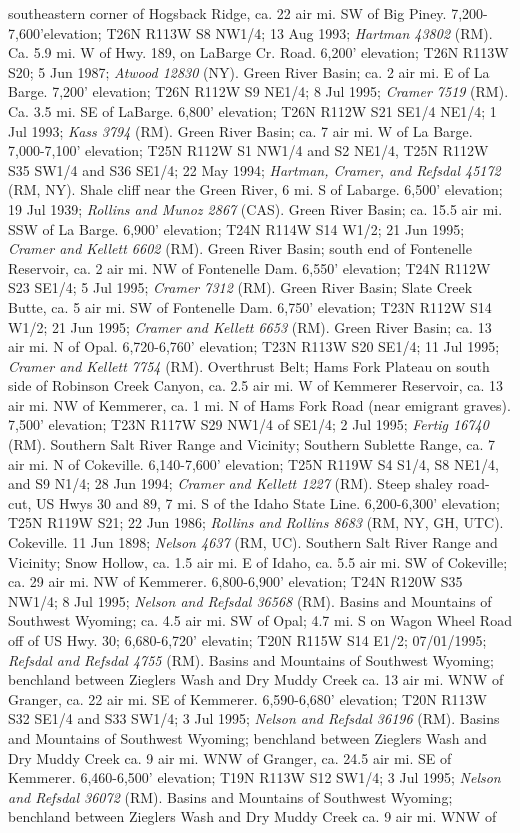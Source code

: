 southeastern corner of Hogsback Ridge, ca. 22 air mi. SW of Big Piney. 7,200-7,600'elevation; T26N R113W S8	NW1/4; 13 Aug 1993; \textit{Hartman 43802} (RM).  Ca. 5.9 mi. W of Hwy. 189, on LaBarge Cr. Road. 6,200' elevation; T26N R113W S20; 5 Jun 1987; \textit{Atwood 12830} (NY).  Green River Basin; ca. 2 air mi. E of La Barge. 7,200' elevation; T26N R112W S9 NE1/4; 8 Jul 1995; \textit{Cramer 7519} (RM).  Ca. 3.5 mi. SE of LaBarge. 6,800' elevation; T26N R112W S21 SE1/4 NE1/4; 1 Jul 1993; \textit{Kass 3794} (RM).  Green River Basin; ca. 7 air mi. W of La Barge. 7,000-7,100' elevation; T25N R112W S1 NW1/4 and S2 NE1/4, T25N R112W S35 SW1/4 and S36 SE1/4; 22 May 1994; \textit{Hartman, Cramer, and Refsdal 45172} (RM, NY).  Shale cliff near the Green River, 6 mi. S of Labarge. 6,500' elevation; 19 Jul 1939; \textit{Rollins and Munoz 2867} (CAS).  Green River Basin; ca. 15.5 air mi. SSW of La Barge. 6,900' elevation; T24N R114W S14 W1/2; 21 Jun 1995; \textit{Cramer and Kellett 6602} (RM).  Green River Basin; south end of Fontenelle Reservoir, ca. 2 air mi. NW of Fontenelle Dam. 6,550' elevation; T24N R112W S23 SE1/4; 5 Jul 1995; \textit{Cramer 7312} (RM).  Green River Basin; Slate Creek Butte, ca. 5 air mi. SW of Fontenelle Dam. 6,750' elevation; T23N R112W S14 W1/2; 21 Jun 1995; \textit{Cramer and Kellett 6653} (RM).  Green River Basin; ca. 13 air mi. N of Opal. 6,720-6,760' elevation; T23N R113W S20 SE1/4; 11 Jul 1995; \textit{Cramer and Kellett 7754} (RM).  Overthrust Belt; Hams Fork Plateau on south side of Robinson Creek Canyon, ca. 2.5 air mi. W of Kemmerer Reservoir, ca. 13 air mi. NW of Kemmerer, ca. 1 mi. N of Hams Fork Road (near emigrant graves). 7,500' elevation; T23N R117W S29 NW1/4 of SE1/4; 2 Jul 1995; \textit{Fertig 16740} (RM).  Southern Salt River Range and Vicinity; Southern Sublette Range, ca. 7 air mi. N of Cokeville. 6,140-7,600' elevation; T25N R119W S4 S1/4, S8 NE1/4, and S9 N1/4; 28 Jun 1994; \textit{Cramer and Kellett 1227} (RM).  Steep shaley road-cut, US Hwys 30 and 89, 7 mi. S of the Idaho State Line. 6,200-6,300' elevation; T25N R119W S21; 22 Jun 1986; \textit{Rollins and Rollins 8683} (RM, NY, GH, UTC).  Cokeville. 11 Jun 1898; \textit{Nelson 4637} (RM, UC).  Southern Salt River Range and Vicinity; Snow Hollow, ca. 1.5 air mi. E of Idaho, ca. 5.5 air mi. SW of Cokeville; ca. 29 air mi. NW of Kemmerer.  6,800-6,900' elevation; T24N R120W S35 NW1/4; 8 Jul 1995; \textit{Nelson and Refsdal 36568} (RM).  Basins and Mountains of Southwest Wyoming; ca. 4.5 air mi. SW of Opal; 4.7 mi. S on Wagon Wheel Road off of US Hwy. 30; 6,680-6,720' elevatin; T20N R115W S14 E1/2; 07/01/1995; \textit{Refsdal and Refsdal 4755} (RM).  Basins and Mountains of Southwest Wyoming; benchland between Zieglers Wash and Dry Muddy Creek ca. 13 air mi. WNW of Granger, ca. 22 air mi. SE of Kemmerer. 6,590-6,680' elevation; T20N R113W S32 SE1/4 and S33 SW1/4; 3 Jul 1995; \textit{Nelson and Refsdal 36196} (RM).  Basins and Mountains of Southwest Wyoming; benchland between Zieglers Wash and Dry Muddy Creek ca. 9 air mi. WNW of Granger, ca. 24.5 air mi. SE of Kemmerer. 6,460-6,500' elevation; T19N R113W S12 SW1/4; 3 Jul 1995; \textit{Nelson and Refsdal 36072} (RM).  Basins and Mountains of Southwest Wyoming; benchland between Zieglers Wash and Dry Muddy Creek ca. 9 air mi. WNW of 
